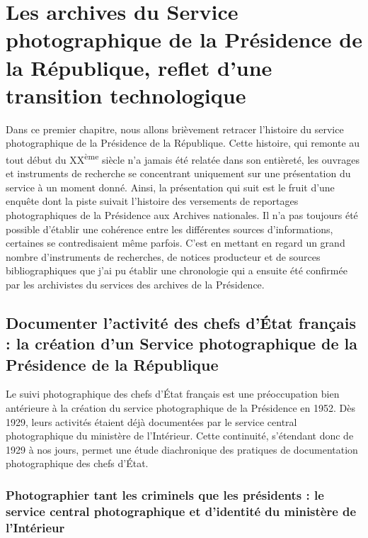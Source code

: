 \chapter{Les archives du Service photographique de la Présidence de la République, reflet d'une transition technologique}

Dans ce premier chapitre, nous allons brièvement retracer l'histoire du service photographique de la Présidence de la République. Cette histoire, qui remonte au tout début du XX\textsuperscript{ème} siècle n'a jamais été relatée dans son entièreté, les ouvrages et instruments de recherche se concentrant uniquement sur une présentation du service à un moment donné. Ainsi, la présentation qui suit est le fruit d'une enquête dont la piste suivait l'histoire des versements de reportages photographiques de la Présidence aux Archives nationales. Il n'a pas toujours été possible d'établir une cohérence entre les différentes sources d'informations, certaines se contredisaient même parfois. C'est en mettant en regard un grand nombre d'instruments de recherches, de notices producteur et de sources bibliographiques que j'ai pu établir une chronologie qui a ensuite été confirmée par les archivistes du services des archives de la Présidence.

\section{Documenter l'activité des chefs d'État français : la création d'un Service photographique de la Présidence de la République }

Le suivi photographique des chefs d'État français est une préoccupation bien antérieure à la création du service photographique de la Présidence en 1952. Dès 1929, leurs activités étaient déjà documentées par le service central photographique du ministère de l'Intérieur. Cette continuité, s'étendant donc de 1929 à nos jours, permet une étude diachronique des pratiques de documentation photographique des chefs d'État.

\subsection*{Photographier tant les criminels que les présidents : le service central photographique et d'identité du ministère de l'Intérieur}

